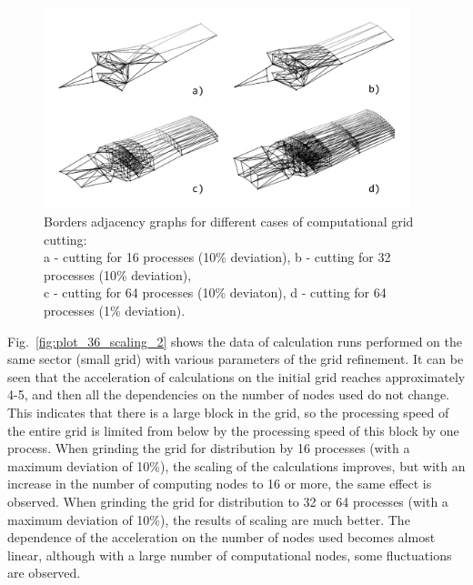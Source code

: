 \documentclass[
11pt,%
tightenlines,%
twoside,%
onecolumn,%
nofloats,%
nobibnotes,%
nofootinbib,%
superscriptaddress,%
noshowpacs,%
centertags]%
{revtex4}
\begin{document}
\begin{figure}[h]
\setcaptionmargin{5mm}
\onelinecaptionsfalse
\includegraphics[width=0.95\textwidth]{pics/g_36_2.pdf}
\caption{Borders adjacency graphs for different cases of computational grid cutting: \\ a - cutting for 16 processes (10\% deviation), b - cutting for 32 processes (10\% deviation), \\ c - cutting for 64 processes (10\% deviaton), d - cutting for 64 processes (1\% deviation).}
\label{fig:g_36_2}
\end{figure}

Fig.~\ref{fig:plot_36_scaling_2} shows the data of calculation runs performed on the same sector (small grid) with various parameters of the grid refinement.
It can be seen that the acceleration of calculations on the initial grid reaches approximately 4-5, and then all the dependencies on the number of nodes used do not change.
This indicates that there is a large block in the grid, so the processing speed of the entire grid is limited from below by the processing speed of this block by one process.
When grinding the grid for distribution by 16 processes (with a maximum deviation of 10\%), the scaling of the calculations improves, but with an increase in the number of computing nodes to 16 or more, the same effect is observed.
When grinding the grid for distribution to 32 or 64 processes (with a maximum deviation of 10\%), the results of scaling are much better.
The dependence of the acceleration on the number of nodes used becomes almost linear, although with a large number of computational nodes, some fluctuations are observed.
\end{document}
